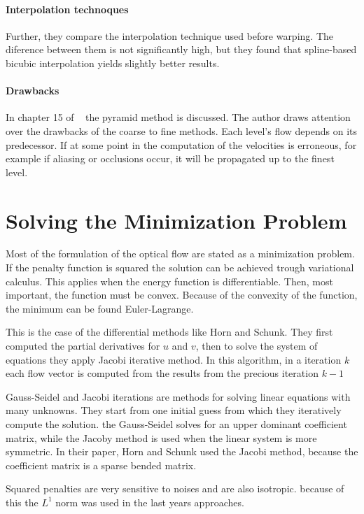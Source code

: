 \documentclass[12pt,a4paper,twoside]{report}
\begin{document}
\paragraph{Interpolation technoques} Further, they compare the interpolation technique used before warping.
The diference between them is not significantly high, but they found that spline-based bicubic interpolation yields slightly better results.

\paragraph{Drawbacks}In chapter 15 of ~\cite{fleet2006} the pyramid method is discussed. The author draws attention over the drawbacks of the coarse to fine methods. Each level's flow depends on its predecessor. If at some point in the computation of the velocities is erroneous, for example if aliasing or occlusions occur, it will be propagated up to the finest level.
 
\section{Solving the Minimization Problem}
Most of the formulation of the optical flow are stated as a minimization problem. If the penalty function is squared the solution can be achieved trough variational calculus. This applies when the energy function is differentiable. Then, most important, the function must be convex. Because of the convexity of the function, the minimum can be found Euler-Lagrange. 

This is the case of the differential methods like Horn and Schunk. They first computed the partial derivatives for $u$ and $v$, then to solve the system of equations they apply Jacobi iterative method. In this algorithm, in a iteration $k$ each flow vector is computed from the results from the precious iteration $k-1$

Gauss-Seidel and Jacobi iterations are methods for solving linear equations with many unknowns. They start from one initial guess from which they iteratively compute the solution. the Gauss-Seidel solves for an upper dominant coefficient matrix, while the Jacoby method is used when the linear system is more symmetric. In their paper, Horn and Schunk used the Jacobi method, because the coefficient matrix is a sparse bended matrix.

Squared penalties are very sensitive to noises and are also isotropic. because of this the $L^1$ norm was used in the last years approaches.
\end{document}
